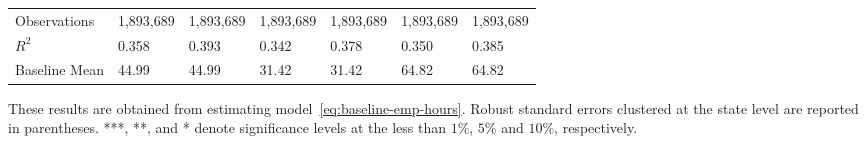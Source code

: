\begin{table}[H]
{\begin{tabular}{@{}lllllll@{}}
            Observations        & 1,893,689 & 1,893,689 & 1,893,689 & 1,893,689 & 1,893,689 & 1,893,689 \\
            $R^2$               & 0.358     & 0.393     & 0.342     & 0.378     & 0.350     & 0.385     \\
            Baseline Mean       & 44.99     & 44.99     & 31.42     & 31.42     & 64.82     & 64.82     \\ \bottomrule \bottomrule
        \end{tabular}%
    }
    \begin{minipage}{18cm}
        \vspace{0.05in}
        These results are obtained from estimating model~\ref{eq:baseline-emp-hours}. Robust standard errors clustered at the state level are reported in parentheses. ***, **, and * denote significance levels at the less than $1\%$, $5\%$ and $10\%$, respectively.
    \end{minipage}
\end{table}